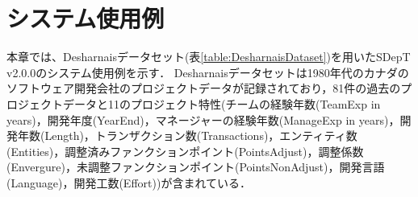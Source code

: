 \section{システム使用例}\label{sec:4}%
本章では、Desharnaisデータセット\cite{Desharnais89}(表\ref{table:DesharnaisDataset})を用いたSDepT v2.0.0のシステム使用例を示す．
Desharnaisデータセットは1980年代のカナダのソフトウェア開発会社のプロジェクトデータが記録されており，81件の過去のプロジェクトデータと11のプロジェクト特性(チームの経験年数(TeamExp in years)，開発年度(YearEnd)，マネージャーの経験年数(ManageExp in years)，開発年数(Length)，トランザクション数(Transactions)，エンティティ数(Entities)，調整済みファンクションポイント(PointsAdjust)，調整係数(Envergure)，未調整ファンクションポイント(PointsNonAdjust)，開発言語(Language)，開発工数(Effort))が含まれている．




